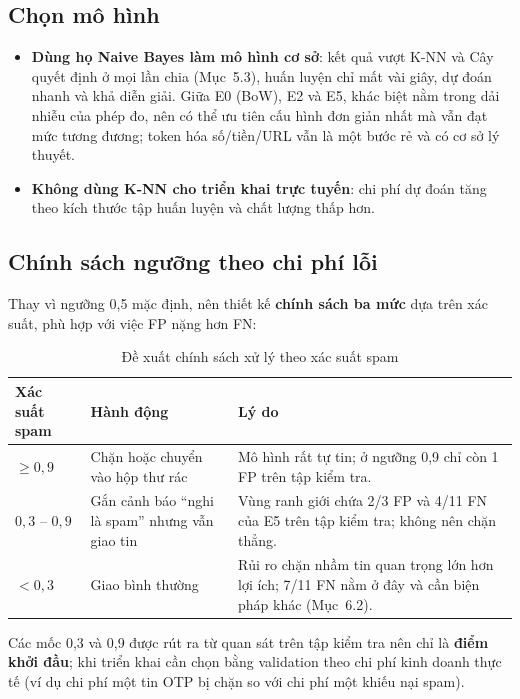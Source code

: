 \subsection{Chọn mô hình}

\begin{itemize}
    \item \textbf{Dùng họ Naive Bayes làm mô hình cơ sở}: kết quả vượt K-NN và Cây quyết định ở mọi lần chia (Mục~5.3), huấn luyện chỉ mất vài giây, dự đoán nhanh và khả diễn giải. Giữa E0 (BoW), E2 và E5, khác biệt nằm trong dải nhiễu của phép đo, nên có thể ưu tiên cấu hình đơn giản nhất mà vẫn đạt mức tương đương; token hóa số/tiền/URL vẫn là một bước rẻ và có cơ sở lý thuyết.
    \item \textbf{Không dùng K-NN cho triển khai trực tuyến}: chi phí dự đoán tăng theo kích thước tập huấn luyện và chất lượng thấp hơn.
\end{itemize}

\subsection{Chính sách ngưỡng theo chi phí lỗi}

Thay vì ngưỡng 0,5 mặc định, nên thiết kế \textbf{chính sách ba mức} dựa trên xác suất, phù hợp với việc FP nặng hơn FN:

\begin{table}[H]
\centering
\caption{Đề xuất chính sách xử lý theo xác suất spam}
\label{tab:chinh-sach}
\begin{tabular}{|p{3.4cm}|p{4.2cm}|p{6.2cm}|}
\hline
\textbf{Xác suất spam} & \textbf{Hành động} & \textbf{Lý do} \\
\hline
$\ge 0{,}9$ & Chặn hoặc chuyển vào hộp thư rác & Mô hình rất tự tin; ở ngưỡng 0,9 chỉ còn 1 FP trên tập kiểm tra. \\
\hline
$0{,}3$ -- $0{,}9$ & Gắn cảnh báo ``nghi là spam'' nhưng vẫn giao tin & Vùng ranh giới chứa 2/3 FP và 4/11 FN của E5 trên tập kiểm tra; không nên chặn thẳng. \\
\hline
$< 0{,}3$ & Giao bình thường & Rủi ro chặn nhầm tin quan trọng lớn hơn lợi ích; 7/11 FN nằm ở đây và cần biện pháp khác (Mục~6.2). \\
\hline
\end{tabular}
\end{table}

Các mốc 0,3 và 0,9 được rút ra từ quan sát trên tập kiểm tra nên chỉ là \textbf{điểm khởi đầu}; khi triển khai cần chọn bằng validation theo chi phí kinh doanh thực tế (ví dụ chi phí một tin OTP bị chặn so với chi phí một khiếu nại spam).

